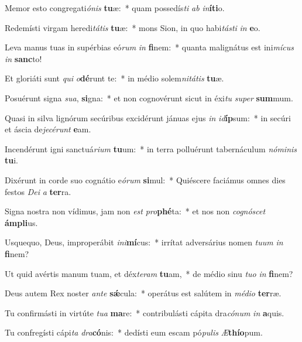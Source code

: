 \item Memor esto congregati\textit{ó}\textit{nis} \textbf{tu}æ:~* quam possedís\textit{ti} \textit{ab} \textit{in}\textbf{í}\textbf{ti}o.
\item Redemísti virgam heredi\textit{tá}\textit{tis} \textbf{tu}æ:~* mons Sion, in quo habi\textit{tás}\textit{ti} \textit{in} \textbf{e}o.
\item Leva manus tuas in supérbias eó\textit{rum} \textit{in} \textbf{fi}nem:~* quanta malignátus est ini\textit{mí}\textit{cus} \textit{in} \textbf{sanc}to!
\item Et gloriáti sunt \textit{qui} \textit{o}\textbf{dé}runt te:~* in médio solem\textit{ni}\textit{tá}\textit{tis} \textbf{tu}æ.
\item Posuérunt signa \textit{su}\textit{a}, \textbf{si}gna:~* et non cognovérunt sicut in éxi\textit{tu} \textit{su}\textit{per} \textbf{sum}mum.
\item Quasi in silva lignórum secúribus excidérunt jánuas ejus \textit{in} \textit{id}\textbf{íp}sum:~* in secúri et áscia de\textit{je}\textit{cé}\textit{runt} \textbf{e}am.
\item Incendérunt igni sanctuá\textit{ri}\textit{um} \textbf{tu}um:~* in terra polluérunt tabernáculum \textit{nó}\textit{mi}\textit{nis} \textbf{tu}i.
\item Dixérunt in corde suo cognátio e\textit{ó}\textit{rum} \textbf{si}mul:~* Quiéscere faciámus omnes dies festos \textit{De}\textit{i} \textit{a} \textbf{ter}ra.
\item Signa nostra non vídimus, jam non \textit{est} \textit{pro}\textbf{phé}ta:~* et nos non \textit{co}\textit{gnó}\textit{scet} \textbf{ám}\textbf{pli}us.
\item Usquequo, Deus, improperábit \textit{in}\textit{i}\textbf{mí}cus:~* irrítat adversárius nomen \textit{tu}\textit{um} \textit{in} \textbf{fi}nem?
\item Ut quid avértis manum tuam, et déx\textit{te}\textit{ram} \textbf{tu}am,~* de médio sinu \textit{tu}\textit{o} \textit{in} \textbf{fi}nem?
\item Deus autem Rex noster \textit{an}\textit{te} \textbf{sǽ}cula:~* operátus est salútem in \textit{mé}\textit{di}\textit{o} \textbf{ter}ræ.
\item Tu confirmásti in virtúte \textit{tu}\textit{a} \textbf{ma}re:~* contribulásti cápita dra\textit{có}\textit{num} \textit{in} \textbf{a}quis.
\item Tu confregísti cápi\textit{ta} \textit{dra}\textbf{có}nis:~* dedísti eum escam pó\textit{pu}\textit{lis} \textit{Æ}\textbf{thí}\textbf{o}pum.
